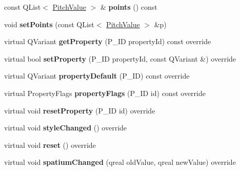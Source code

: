 \begin{DoxyCompactItemize}
const Q\+List$<$ \hyperlink{struct_ms_1_1_pitch_value}{Pitch\+Value} $>$ \& {\bfseries points} () const
\item 
\mbox{\label{class_ms_1_1_tremolo_bar_a0f4510d81538da7471447cdce4b6fe17}} 
void {\bfseries set\+Points} (const Q\+List$<$ \hyperlink{struct_ms_1_1_pitch_value}{Pitch\+Value} $>$ \&p)
\item 
\mbox{\label{class_ms_1_1_tremolo_bar_aaa68481aea328d44c57e4c993aa60dba}} 
virtual Q\+Variant {\bfseries get\+Property} (P\+\_\+\+ID property\+Id) const override
\item 
\mbox{\label{class_ms_1_1_tremolo_bar_a93987317a3f5cb96f82385834df6633a}} 
virtual bool {\bfseries set\+Property} (P\+\_\+\+ID property\+Id, const Q\+Variant \&) override
\item 
\mbox{\label{class_ms_1_1_tremolo_bar_ae120342a1eb3bfccad0b816295310d60}} 
virtual Q\+Variant {\bfseries property\+Default} (P\+\_\+\+ID) const override
\item 
\mbox{\label{class_ms_1_1_tremolo_bar_aa6c451483d9dae43f2b3b48279cb3bdd}} 
virtual Property\+Flags {\bfseries property\+Flags} (P\+\_\+\+ID id) const override
\item 
\mbox{\label{class_ms_1_1_tremolo_bar_a51cd1e4efc87d3cbece18e622db93151}} 
virtual void {\bfseries reset\+Property} (P\+\_\+\+ID id) override
\item 
\mbox{\label{class_ms_1_1_tremolo_bar_afe8212e082817883c546040b79779c96}} 
virtual void {\bfseries style\+Changed} () override
\item 
\mbox{\label{class_ms_1_1_tremolo_bar_aa2ae8fad92566964ddd6a15e53073cd0}} 
virtual void {\bfseries reset} () override
\item 
\mbox{\label{class_ms_1_1_tremolo_bar_a63e9521c3e8944b15abed17678a3560c}} 
virtual void {\bfseries spatium\+Changed} (qreal old\+Value, qreal new\+Value) override
\item 

\end{DoxyCompactItemize}
